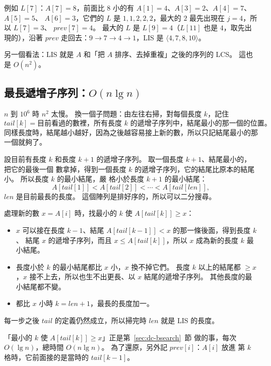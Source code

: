 例如 $L[7]$：$A[7] = 8$，前面比 $8$ 小的有 $A[1] = 4$、$A[3] = 2$、$A[4] = 7$、$A[5] = 5$、
$A[6] = 3$，它們的 $L$ 是 $1, 1, 2, 2, 2$，最大的 $2$ 最先出現在 $j = 4$，所以 $L[7] = 3$、
$\mathit{prev}[7] = 4$。 最大的 $L$ 是 $L[9] = 4$（$L[11]$ 也是 $4$，取先出現的），沿著
$\mathit{prev}$ 走回去：$9 \to 7 \to 4 \to 1$，LIS 是 $\langle 4, 7, 8, 10 \rangle$。

另一個看法：LIS 就是 $A$ 和「把 $A$ 排序、去掉重複」之後的序列的 LCS。 這也是 $O(n^2)$。

\subsection{最長遞增子序列：\texorpdfstring{$O(n \lg n)$}{O(n lg n)}}
\label{sec:dp-lis-fast}

$n$ 到 $10^6$ 時 $n^2$ 太慢。 換一個子問題：由左往右掃，對每個長度 $k$，記住
\[
\mathit{tail}[k] = \text{目前看過的數裡，所有長度 $k$ 的遞增子序列中，結尾最小的那一個的位置。}
\]
同樣長度時，結尾越小越好，因為之後越容易接上新的數，所以只記結尾最小的那一個就夠了。

\begin{whybox}
設目前有長度 $k$ 和長度 $k+1$ 的遞增子序列。 取一個長度 $k + 1$、結尾最小的，把它的最後一個
數拿掉，得到一個長度 $k$ 的遞增子序列，它的結尾比原本的結尾小。 所以長度 $k$ 的最小結尾，嚴
格小於長度 $k + 1$ 的最小結尾：
\[
A[\mathit{tail}[1]] < A[\mathit{tail}[2]] < \cdots < A[\mathit{tail}[\mathit{len}]] ,
\]
$\mathit{len}$ 是目前最長的長度。 這個陣列是排好序的，所以可以二分搜尋。

處理新的數 $x = A[i]$ 時，找最小的 $k$ 使 $A[\mathit{tail}[k]] \ge x$：
\begin{itemize}
\item $x$ 可以接在長度 $k - 1$、結尾 $A[\mathit{tail}[k-1]] < x$ 的那一條後面，得到長度 $k$、
結尾 $x$ 的遞增子序列，而且 $x \le A[\mathit{tail}[k]]$，所以 $x$ 成為新的長度 $k$ 最小結尾。
\item 長度小於 $k$ 的最小結尾都比 $x$ 小，$x$ 換不掉它們。 長度 $k$ 以上的結尾都 $\ge x$，$x$
接不上去，所以也生不出更長、以 $x$ 結尾的遞增子序列。 其他長度的最小結尾都不變。
\item 都比 $x$ 小時 $k = \mathit{len} + 1$，最長的長度加一。
\end{itemize}
每一步之後 $\mathit{tail}$ 的定義仍然成立，所以掃完時 $\mathit{len}$ 就是 LIS 的長度。
\end{whybox}

「最小的 $k$ 使 $A[\mathit{tail}[k]] \ge x$」正是第~\ref{sec:dc-bsearch}~節 
做的事，每次 $O(\lg n)$，總時間 $O(n \lg n)$。 為了還原，另外記 $\mathit{prev}[i]$：$A[i]$ 放進
第 $k$ 格時，它前面接的是當時的 $\mathit{tail}[k - 1]$。

